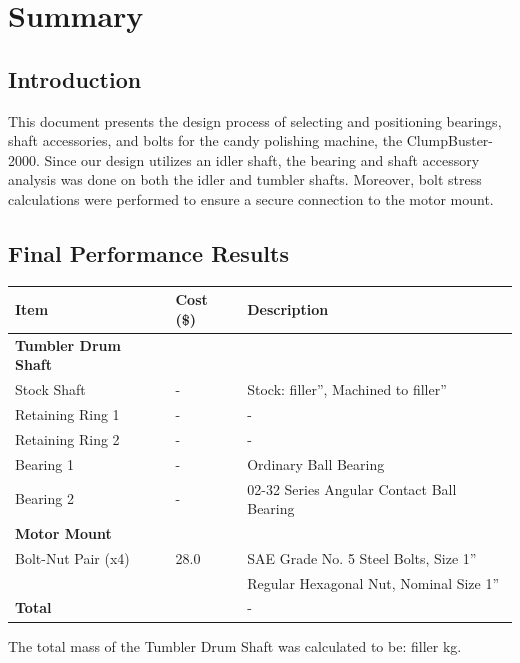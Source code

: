 \documentclass[letterpaper,12pt]{article}
\begin{document}
\section{Summary}

\subsection{Introduction}
This document presents the design process of selecting and positioning bearings, shaft accessories, and bolts for the candy polishing machine, the ClumpBuster-2000. Since our design utilizes an idler shaft, the bearing and shaft accessory analysis was done on both the idler and tumbler shafts. Moreover, bolt stress calculations were performed to ensure a secure connection to the motor mount.

\subsection{Final Performance Results}
\begin{center}
	\begin{tabular}{ |p{4cm}||p{2cm}|p{7.5cm}|  }
		\hline
		\textbf{Item} & \textbf{Cost (\$)} & \textbf{Description} \\
		\hline
		\hline
		\textbf{Tumbler Drum Shaft} & & \\
		Stock Shaft & - & Stock: filler'', Machined to filler'' \\
		Retaining Ring 1 & - & - \\
		Retaining Ring 2 & - & - \\
		Bearing 1 & - & Ordinary Ball Bearing \\
		Bearing 2 & - & 02-32 Series Angular Contact Ball Bearing \\
		\hline
		\hline
		\textbf{Motor Mount} & & \\
		Bolt-Nut Pair (x4) & 28.0 & SAE Grade No. 5 Steel Bolts, Size 1'' \\
		 & & Regular Hexagonal Nut, Nominal Size 1'' \\
		\hline
		\hline
		\textbf{Total} & \textbf{ }& - \\
		\hline
	\end{tabular}
\end{center}

The total mass of the Tumbler Drum Shaft was calculated to be: filler kg.
\end{document}
